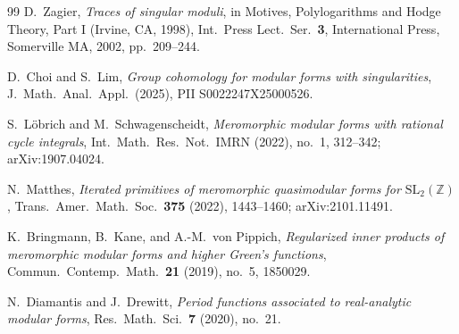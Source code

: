\documentclass[11pt]{article}
\begin{document}
\begin{thebibliography}{99}
D.\ Zagier,
\emph{Traces of singular moduli},
in Motives, Polylogarithms and Hodge Theory, Part I (Irvine, CA, 1998),
Int.\ Press Lect.\ Ser.\ \textbf{3}, International Press, Somerville MA, 2002, pp.\ 209--244.

D.\ Choi and S.\ Lim,
\emph{Group cohomology for modular forms with singularities},
J.\ Math.\ Anal.\ Appl.\ (2025), PII S0022247X25000526.

S.\ L\"obrich and M.\ Schwagenscheidt,
\emph{Meromorphic modular forms with rational cycle integrals},
Int.\ Math.\ Res.\ Not.\ IMRN (2022), no.\ 1, 312--342; arXiv:1907.04024.

N.\ Matthes,
\emph{Iterated primitives of meromorphic quasimodular forms for $\mathrm{SL}_2(\mathbb{Z})$},
Trans.\ Amer.\ Math.\ Soc.\ \textbf{375} (2022), 1443--1460; arXiv:2101.11491.

K.\ Bringmann, B.\ Kane, and A.-M.\ von Pippich,
\emph{Regularized inner products of meromorphic modular forms and higher Green's functions},
Commun.\ Contemp.\ Math.\ \textbf{21} (2019), no.\ 5, 1850029.

N.\ Diamantis and J.\ Drewitt,
\emph{Period functions associated to real-analytic modular forms},
Res.\ Math.\ Sci.\ \textbf{7} (2020), no.\ 21.


  
\end{thebibliography}
\end{document}
